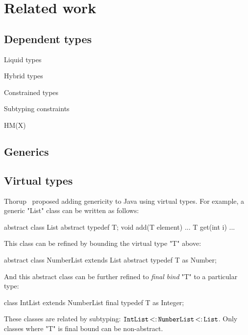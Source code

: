 \documentclass[preprint,nocopyrightspace,9pt]{sigplanconf}
\begin{document}

\section{Related work}
\label{sec:related}

\subsection{Dependent types}

\cite{dependent-types,xi99dependent,ocrz-ecoop03,aspinall-attapl,cayenne,epigram-matter,calc-constructions}

Liquid types \cite{liquid-types}

Hybrid types \cite{flanagan-popl06,flanagan-fool06}

Constrained types
\cite{sulzmann97type}
\cite{trifonov96}
\cite{pottier01b}

Subtyping constraints
\cite{pottier96simplifying}

HM(X) \cite{pottier01a}


\subsection{Generics}

\cite{unifying-genericity}
\cite{adding-wildcards}
\cite{emir06}
\cite{myers94}
\cite{polyj}
\cite{allen04}
\cite{allen03}

\subsection{Virtual types}
\label{sec:virtual}

Thorup~\cite{thorup97}
proposed adding genericity to Java using virtual types.  For example,
a generic \xcd"List" class can be written as follows:
\begin{xten}
abstract class List {
    abstract typedef T;
    void add(T element) { ... }
    T get(int i) { ... }
}
\end{xten}
This class can be refined by bounding the virtual type \xcd"T" above:
\begin{xten}
abstract class NumberList extends List {
    abstract typedef T as Number;
}
\end{xten}
And this abstract class can be further refined to \emph{final bind}
\xcd"T" to a particular type:
\begin{xten}
class IntList extends NumberList {
    final typedef T as Integer;
}
\end{xten}
These classes are related by subtyping:
${\tt IntList} \subtype {\tt NumberList} \subtype {\tt List}$.
Only classes where \xcd"T" is final bound can be non-abstract.
\end{document}
